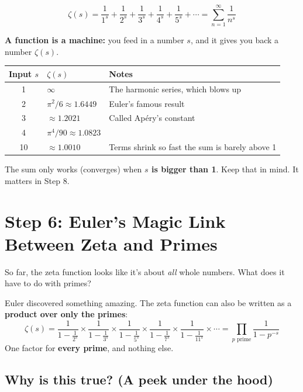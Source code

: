 \documentclass[11pt,a4paper]{article}
\begin{document}
\begin{keybox}
\[
\zeta(s) = \frac1{1^s} + \frac1{2^s} + \frac1{3^s} + \frac1{4^s} + \frac1{5^s} + \cdots = \sum_{n=1}^{\infty} \frac{1}{n^s}
\]
\end{keybox}

\textbf{A function is a machine:} you feed in a number $s$, and it gives you back a number $\zeta(s)$.

\begin{center}
\begin{tabular}{c l l}
\toprule
Input $s$ & $\zeta(s)$ & Notes \\
\midrule
1 & $\infty$ & The harmonic series, which blows up \\
2 & $\pi^2/6 \approx 1.6449$ & Euler's famous result \\
3 & $\approx 1.2021$ & Called Ap\'ery's constant \\
4 & $\pi^4/90 \approx 1.0823$ & \\
10 & $\approx 1.0010$ & Terms shrink so fast the sum is barely above 1 \\
\bottomrule
\end{tabular}
\end{center}

The sum only works (converges) when \textbf{$s$ is bigger than 1}. Keep that in mind. It matters in Step 8.

\section{Step 6: Euler's Magic Link Between Zeta and Primes}

So far, the zeta function looks like it's about \emph{all} whole numbers. What does it have to do with primes?

Euler discovered something amazing. The zeta function can also be written as a \textbf{product over only the primes}:
\[
\zeta(s) = \frac{1}{1-\frac{1}{2^s}} \times \frac{1}{1-\frac{1}{3^s}} \times \frac{1}{1-\frac{1}{5^s}} \times \frac{1}{1-\frac{1}{7^s}} \times \frac{1}{1-\frac{1}{11^s}} \times \cdots = \prod_{p \text{ prime}} \frac{1}{1-p^{-s}}
\]
One factor for \textbf{every prime}, and nothing else.

\subsection*{Why is this true? (A peek under the hood)}
\end{document}
